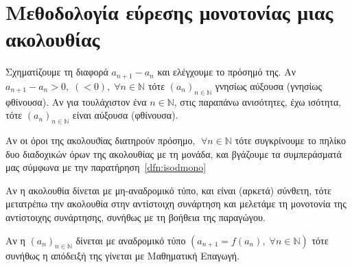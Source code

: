 \section{Μεθοδολογία εύρεσης μονοτονίας μιας ακολουθίας}
\begin{myitemize}
  \item Σχηματίζουμε τη διαφορά $ a_{n+1} - a_n $ και ελέγχουμε το πρόσημό της. 
    Αν $ a_{n+1}-a_{n}>0, \; (<0), \; \forall n \in \mathbb{N} $ τότε 
    $ (a_{n})_{n \in \mathbb{N}}$ γνησίως αύξουσα (γνησίως φθίνουσα). 
    Αν για τουλάχιστον ένα $ n \in \mathbb{N} $, στις παραπάνω ανισότητες, 
    έχω ισότητα, τότε  $ (a_{n})_{n \in \mathbb{N}} $ είναι αύξουσα (φθίνουσα).
  \item Αν οι όροι της ακολουϑίας διατηρούν πρόσημο, $ \; \forall n \in \mathbb{N} $ 
    τότε συγκρίνουμε το πηλίκο δυο διαδοχικών όρων της ακολουθίας με τη μονάδα, 
    και βγάζουμε τα συμπεράσματά μας σύμφωνα με την παρατήρηση~\ref{dfn:isodmono}
  \item Αν η ακολουθία δίνεται με μη-αναδρομικό τύπο, και είναι (αρκετά) σύνθετη, 
    τότε μετατρέπω την ακολουθία στην αντίστοιχη συνάρτηση και μελετάμε τη 
    μονοτονία της αντίστοιχης συνάρτησης, συνήθως με τη βοήθεια της παραγώγου.
  \item Αν η $ (a_{n})_{n \in \mathbb{N}} $ δίνεται με αναδρομικό τύπο 
    $ (a_{n+1}= f(a_{n}), \; \forall n \in \mathbb{N}) $ τότε συνήθως η απόδειξή 
    της γίνεται με Μαθηματική Επαγωγή.
\end{myitemize}

